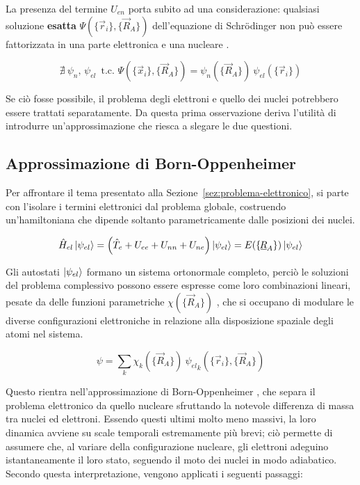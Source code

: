 La presenza del termine $U_{en}$ porta subito ad una considerazione: qualsiasi soluzione \textbf{esatta} $\Psi(\{\vec{r}_i\},\{\vec{R}_A\})$ dell'equazione di Schrödinger non può essere fattorizzata in una parte elettronica e una nucleare \cite{Echenique_2007}.

\begin{equation*}
    \nexists\ \psi_n,\, \psi_{el}\, \text{ t.c. }
    \Psi(\{\vec{x}_i\},\{\vec{R}_A\}) = \psi_n(\{\vec{R}_A\})\ \psi_{el}(\{\vec{r}_i\})
\end{equation*}

Se ciò fosse possibile, il problema degli elettroni e quello dei nuclei potrebbero essere trattati separatamente. Da questa prima osservazione deriva l'utilità di introdurre un'approssimazione che riesca a slegare le due questioni.  
  
\subsection{Approssimazione di Born-Oppenheimer}\label{subsec:Born-Oppenheimer}

Per affrontare il tema presentato alla Sezione~\ref{sez:problema-elettronico}, si parte con l'isolare i termini elettronici dal problema globale, costruendo un'hamiltoniana che dipende soltanto parametricamente dalle posizioni dei nuclei. 

\begin{equation}\label{eqn:hamiltoniana-elettronica}
    \hat{H}_{el} \ket{\psi_{el}} = 
    \left( \hat{T}_e + U_{ee} + U_{nn} + U_{ne} \right) \ket{\psi_{el}} =
    E(\{\underline{\hspace{-0.1em}R\hspace{-0.05em}}_A\}) \ket{\psi_{el}}
\end{equation}

Gli autostati $\ket{\psi_{el}}$ formano un sistema ortonormale completo, perciò le soluzioni del problema complessivo possono essere espresse come loro combinazioni lineari, pesate da delle funzioni parametriche $\chi(\{\vec{R}_A\})$ \cite{Sherril_2005}, che si occupano di modulare le diverse configurazioni elettroniche in relazione alla disposizione spaziale degli atomi nel sistema.

\begin{equation} \label{eqn:combinazione-stati-elettronici}
    \psi = \sum_{k} \chi_k(\{\vec{R}_A\})\ {\psi_{el}}_k(\{\vec{r}_i\},\{\vec{R}_A\})
\end{equation}

Questo rientra nell’approssimazione di Born-Oppenheimer \cite{Born_Opp}, che separa il problema elettronico da quello nucleare sfruttando la notevole differenza di massa tra nuclei ed elettroni. Essendo questi ultimi molto meno massivi, la loro dinamica avviene su scale temporali estremamente più brevi; ciò permette di assumere che, al variare della configurazione nucleare, gli elettroni adeguino istantaneamente il loro stato, seguendo il moto dei nuclei in modo adiabatico. 
Secondo questa interpretazione, vengono applicati i seguenti passaggi:

